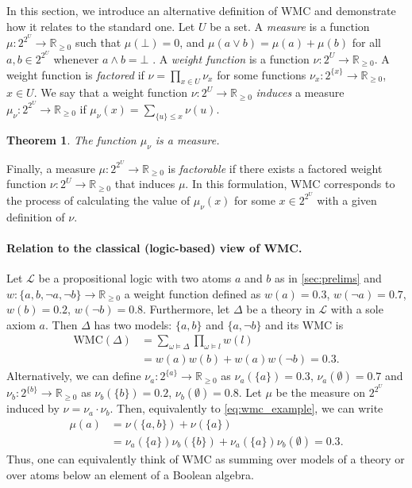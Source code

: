 \documentclass[accepted]{uai2021}
\newtheorem{theorem}{Theorem}
\theoremstyle{definition}
\begin{document}
In this section, we introduce an alternative definition of WMC and demonstrate
how it relates to the standard one. Let $U$ be a set. A \emph{measure} is a
function $\mu\colon 2^{2^U} \to \mathbb{R}_{\ge 0}$ such that $\mu(\bot) = 0$,
and $\mu(a \lor b) = \mu(a) + \mu(b)$ for all $a, b \in 2^{2^U}$ whenever $a
\land b = \bot$ \citep{gaifman1964concerning,DBLP:books/daglib/0090259}. A
\emph{weight function} is a function $\nu\colon 2^U \to \mathbb{R}_{\ge 0}$. A
weight function is \emph{factored} if $\nu = \prod_{x \in U} \nu_x$ for some
functions $\nu_x\colon 2^{\{x\}} \to \mathbb{R}_{\ge 0}$, $x \in U$. We say that
a weight function $\nu\colon 2^U \to \mathbb{R}_{\ge 0}$ \emph{induces} a
measure $\mu_\nu\colon 2^{2^U} \to \mathbb{R}_{\ge 0}$ if $\mu_\nu(x) =
\sum_{\{u\} \le x} \nu(u)$.

\begin{theorem} \label{prop:measure}
  The function $\mu_\nu$ is a measure.
\end{theorem}

Finally, a measure $\mu\colon 2^{2^U} \to \mathbb{R}_{\ge 0}$ is
\emph{factorable} if there exists a factored weight function $\nu\colon 2^U \to
\mathbb{R}_{\ge 0}$ that induces $\mu$. In this formulation, WMC corresponds to
the process of calculating the value of $\mu_\nu(x)$ for some $x \in 2^{2^U}$
with a given definition of $\nu$.

\paragraph{Relation to the classical (logic-based) view of WMC.} Let
$\mathcal{L}$ be a propositional logic with two atoms $a$ and $b$ as in
\cref{sec:prelims} and $w\colon \{ a, b, \neg a, \neg b \} \to \mathbb{R}_{\ge
  0}$ a weight function defined as $w(a) = 0.3$, $w(\neg a) = 0.7$, $w(b)
= 0.2$, $w(\neg b) = 0.8$. Furthermore, let $\Delta$ be a theory in
$\mathcal{L}$ with a sole axiom $a$. Then $\Delta$ has two models: $\{ a, b \}$
and $\{ a, \neg b \}$ and its WMC \citep{DBLP:journals/ai/ChaviraD08} is
\begin{equation} \label{eq:wmc_example}
  \begin{split}
    \mathrm{WMC}(\Delta) &= \sum_{\omega \models \Delta} \prod_{\omega \models l} w(l) \\
    &= w(a)w(b) + w(a)w(\neg b) = 0.3.
  \end{split}
\end{equation}
Alternatively, we can define $\nu_a\colon 2^{\{a\}} \to \mathbb{R}_{\ge 0}$ as
$\nu_a(\{ a \}) = 0.3$, $\nu_a(\emptyset) = 0.7$ and $\nu_b\colon 2^{\{b\}} \to
\mathbb{R}_{\ge 0}$ as $\nu_b(\{ b \}) = 0.2$, $\nu_b(\emptyset) = 0.8$. Let
$\mu$ be the measure on $2^{2^U}$ induced by $\nu = \nu_a \cdot \nu_b$. Then,
equivalently to \cref{eq:wmc_example}, we can write
\begin{align*}
  \mu(a) &= \nu(\{ a, b \}) + \nu(\{ a \}) \\
         &= \nu_a(\{a\})\nu_b(\{b\}) + \nu_a(\{a\})\nu_b(\emptyset) = 0.3.
\end{align*}
Thus, one can equivalently think of WMC as summing over models of a theory or
over atoms below an element of a Boolean algebra.
\end{document}

